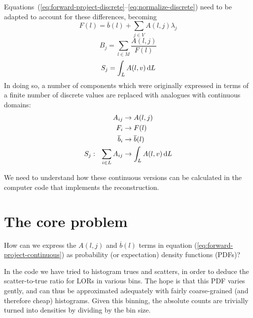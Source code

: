 \documentclass[10pt, a4paper, twocolumn]{article} %
\newcommand\dd[1]  { \,\textrm d{#1} }   %
\begin{document}
Equations~(\ref{eq:forward-project-discrete}--\ref{eq:normalize-discrete})
need to be adapted to account for these differences, becoming
\begin{equation}
  \label{eq:forward-project-continuous}
  F(l) = \overline{b}(l) + \sum_{j\in V}A(l,j)\lambda_{j}
\end{equation}
%
\begin{equation}
  \label{eq:back-project-continuous}
  B_{j} = \sum_{l\in M}\frac{A(l,j)}{F(l)}
\end{equation}
%
\begin{equation}
  \label{eq:normalize-continuous}
  S_{j} = \int_{L} A(l, v) \dd L
\end{equation}
In doing so, a number of components which were originally expressed in terms of
a finite number of discrete values are replaced with analogues with continuous
domains:
\begin{align}
  A_{ij}            & \rightarrow A(l,j)                    \nonumber \\
  F_{i}             & \rightarrow F(l)                      \nonumber \\
  \overline{b}_{i}  & \rightarrow \overline{b}(l)           \nonumber \\
  S_{j}:\ \ \sum_{i\in L}A_{ij} & \rightarrow \int_{L} A(l, v) \dd L    \nonumber
\end{align}

We need to understand how these continuous versions can be calculated in the
computer code that implements the reconstruction.


\section{The core problem}

How can we express the \(A(l,j)\) and \(\overline{b}(l)\) terms in equation
(\ref{eq:forward-project-continuous}) as probability (or expectation) density
functions (PDFs)?

In the code we have tried to histogram trues and scatters, in order to deduce
the scatter-to-true ratio for LORs in various bins. The hope is that this PDF
varies gently, and can thus be approximated adequately with fairly
coarse-grained (and therefore cheap) histograms. Given this binning, the
absolute counts are trivially turned into densities by dividing by the bin size.
\end{document}

